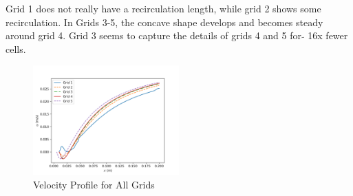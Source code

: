 Grid 1 does not really have a recirculation length, while grid 2 shows some recirculation. In Grids 3-5, the concave shape develops and becomes steady around grid 4. Grid 3 seems to capture the details of grids 4 and 5 for $\tilde{}$ 16x fewer cells.

\begin{figure}[H]
    \centering
    \includegraphics[width=0.5\textwidth]{Questions/Figures/recirc_combined.png}
    \caption{Velocity Profile for All Grids}
    \label{fig:velocity_profile_all_grids}
\end{figure}

